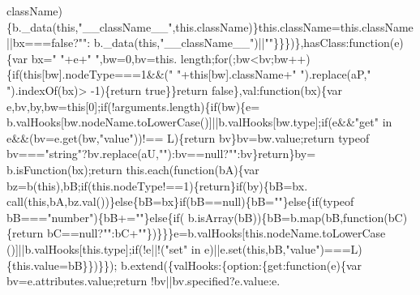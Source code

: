 \begin{DoxyCode}
      className)\{b.\_data(\textcolor{keyword}{this},\textcolor{stringliteral}{"\_\_className\_\_"},this.className)\}this.className=this.className||bx===\textcolor{keyword}{false}?\textcolor{stringliteral}{""}:
      b.\_data(\textcolor{keyword}{this},\textcolor{stringliteral}{"\_\_className\_\_"})||\textcolor{stringliteral}{""}\}\}\})\},hasClass:\textcolor{keyword}{function}(e)\{var bx=\textcolor{stringliteral}{" "}+e+\textcolor{stringliteral}{" "},bw=0,bv=this.
      length;\textcolor{keywordflow}{for}(;bw<bv;bw++)\{\textcolor{keywordflow}{if}(\textcolor{keyword}{this}[bw].nodeType===1&&(\textcolor{stringliteral}{" "}+\textcolor{keyword}{this}[bw].className+\textcolor{stringliteral}{" "}).replace(aP,\textcolor{stringliteral}{" "}).indexOf(bx)>
      -1)\{\textcolor{keywordflow}{return} \textcolor{keyword}{true}\}\}\textcolor{keywordflow}{return} \textcolor{keyword}{false}\},val:\textcolor{keyword}{function}(bx)\{var e,bv,by,bw=\textcolor{keyword}{this}[0];\textcolor{keywordflow}{if}(!arguments.length)\{\textcolor{keywordflow}{if}(bw)\{e=
      b.valHooks[bw.nodeName.toLowerCase()]||b.valHooks[bw.type];\textcolor{keywordflow}{if}(e&&\textcolor{stringliteral}{"get"} in e&&(bv=e.get(bw,\textcolor{stringliteral}{"value"}))!==
      L)\{\textcolor{keywordflow}{return} bv\}bv=bw.value;\textcolor{keywordflow}{return} typeof bv===\textcolor{stringliteral}{"string"}?bv.replace(aU,\textcolor{stringliteral}{""}):bv==null?\textcolor{stringliteral}{""}:bv\}\textcolor{keywordflow}{return}\}by=
      b.isFunction(bx);\textcolor{keywordflow}{return} this.each(\textcolor{keyword}{function}(bA)\{var bz=b(\textcolor{keyword}{this}),bB;\textcolor{keywordflow}{if}(this.nodeType!==1)\{\textcolor{keywordflow}{return}\}\textcolor{keywordflow}{if}(by)\{bB=bx.
      call(\textcolor{keyword}{this},bA,bz.val())\}\textcolor{keywordflow}{else}\{bB=bx\}\textcolor{keywordflow}{if}(bB==null)\{bB=\textcolor{stringliteral}{""}\}\textcolor{keywordflow}{else}\{\textcolor{keywordflow}{if}(typeof bB===\textcolor{stringliteral}{"number"})\{bB+=\textcolor{stringliteral}{""}\}\textcolor{keywordflow}{else}\{\textcolor{keywordflow}{if}(
      b.isArray(bB))\{bB=b.map(bB,\textcolor{keyword}{function}(bC)\{\textcolor{keywordflow}{return} bC==null?\textcolor{stringliteral}{""}:bC+\textcolor{stringliteral}{""}\})\}\}\}e=b.valHooks[\textcolor{keyword}{this}.nodeName.toLowerCase
      ()]||b.valHooks[this.type];\textcolor{keywordflow}{if}(!e||!(\textcolor{stringliteral}{"set"} in e)||e.set(\textcolor{keyword}{this},bB,\textcolor{stringliteral}{"value"})===L)\{this.value=bB\}\})\}\});
      b.extend(\{valHooks:\{option:\{\textcolor{keyword}{get}:\textcolor{keyword}{function}(e)\{var bv=e.attributes.value;\textcolor{keywordflow}{return} !bv||bv.specified?e.value:e.

\end{DoxyCode}
